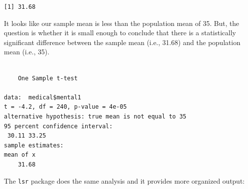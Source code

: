 \documentclass[]{book}
\newenvironment{Shaded}{\begin{snugshade}}{\end{snugshade}}
\newcommand{\CommentTok}[1]{\textcolor[rgb]{0.56,0.35,0.01}{\textit{#1}}}
\newcommand{\DataTypeTok}[1]{\textcolor[rgb]{0.13,0.29,0.53}{#1}}
\newcommand{\DecValTok}[1]{\textcolor[rgb]{0.00,0.00,0.81}{#1}}
\newcommand{\FloatTok}[1]{\textcolor[rgb]{0.00,0.00,0.81}{#1}}
\newcommand{\KeywordTok}[1]{\textcolor[rgb]{0.13,0.29,0.53}{\textbf{#1}}}
\newcommand{\NormalTok}[1]{#1}
\newcommand{\OperatorTok}[1]{\textcolor[rgb]{0.81,0.36,0.00}{\textbf{#1}}}
\newcommand{\OtherTok}[1]{\textcolor[rgb]{0.56,0.35,0.01}{#1}}
\newcommand{\StringTok}[1]{\textcolor[rgb]{0.31,0.60,0.02}{#1}}
\begin{document}
\begin{Shaded}
\end{Shaded}

\begin{verbatim}
[1] 31.68
\end{verbatim}

It looks like our sample mean is less than the population mean of 35. But, the question is whether it is small enough to conclude that there is a statistically significant difference between the sample mean (i.e., 31.68) and the population mean (i.e., 35).

\begin{Shaded}
\end{Shaded}

\begin{verbatim}

    One Sample t-test

data:  medical$mental1
t = -4.2, df = 240, p-value = 4e-05
alternative hypothesis: true mean is not equal to 35
95 percent confidence interval:
 30.11 33.25
sample estimates:
mean of x 
    31.68 
\end{verbatim}

The \texttt{lsr} package \citep{R-lsr} does the same analysis and it provides more organized output:

\begin{Shaded}
\end{Shaded}
\end{document}
